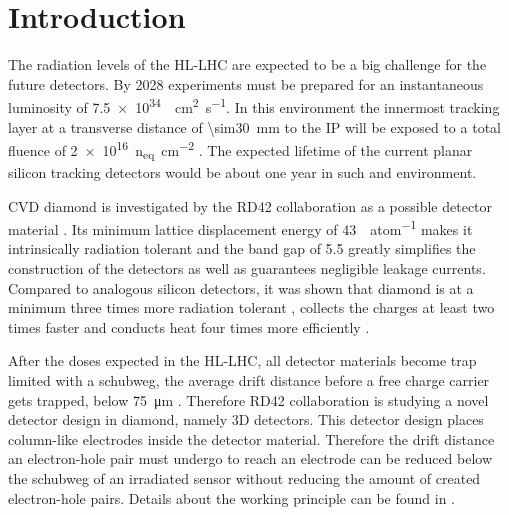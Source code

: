 \section{Introduction}
The radiation levels of the \ac{HL-LHC} are expected to be a big challenge for the future detectors. By 2028 experiments must be prepared for an instantaneous luminosity of \SI{7.5e34}{\per\centi\meter\squared\per\second}. In this environment the innermost tracking layer at a transverse distance of \SI{\sim30}{\milli\meter} to the \acl{IP} will be exposed to a total fluence of \SI{2e16}{n_{eq}\per\centi\meter^2} %
\cite{dose}. The expected lifetime of the current planar silicon tracking detectors would be about one year in such and environment.\par
\ac{CVD} diamond is investigated by the RD42 collaboration as a possible detector material \cite{rd42}. Its minimum lattice displacement energy of \SI{43}{\ev\per atom} \cite{koike} makes it intrinsically radiation tolerant and the band gap of \SI{5.5}{\ev} greatly simplifies the construction of the detectors as well as guarantees negligible leakage currents. Compared to analogous silicon detectors, it was shown that diamond is at a minimum three times more radiation tolerant \cite{deboer}, collects the charges at least two times faster \cite{pernegger} and conducts heat four times more efficiently \cite{zhao}.\par
After the doses expected in the \ac{HL-LHC}, all detector materials become trap limited with a schubweg, the average drift distance before a free charge carrier gets trapped, below \SI{75}{\micro\meter} \cite{feick, wen2}. 
Therefore RD42 collaboration is studying a novel detector design in diamond, namely 3D detectors. This detector design places column-like electrodes inside the detector material. Therefore the drift distance an electron-hole pair must undergo to reach an electrode can be reduced below the schubweg of an irradiated sensor without reducing the amount of created electron-hole pairs. Details about the working principle can be found in \cite{parker}.
